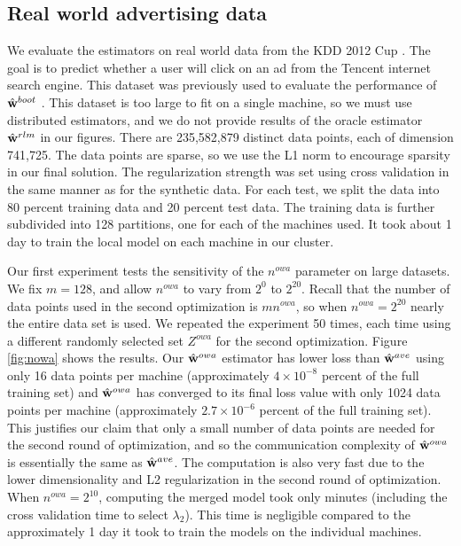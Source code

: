 \documentclass[thesis.tex]{subfiles}
\newcommand{\Zowa}{Z^{\textit{owa}}}
\newcommand{\nowa}{n^{\textit{owa}}}
\begin{document}
\vspace{-0.1in}
\subsection{Real world advertising data}

\vspace{-0.05in}
We evaluate the estimators on real world data from the KDD 2012 Cup \citep{kddcup2012}.
The goal is to predict whether a user will click on an ad from the Tencent internet search engine.
This dataset was previously used to evaluate the performance of $\hat{\mathbf w}^{boot}$ \citep{zhang2012communication}.
This dataset is too large to fit on a single machine,
so we must use distributed estimators,
and we do not provide results of the oracle estimator $\hat{\mathbf w}^{rlm}$ in our figures.
There are 235,582,879 distinct data points,
each of dimension 741,725.
The data points are sparse, so we use the L1 norm to encourage sparsity in our final solution.
The regularization strength was set using cross validation in the same manner as for the synthetic data.
For each test, we split the data into 80 percent training data and 20 percent test data.
The training data is further subdivided into 128 partitions,
one for each of the machines used.
It took about 1 day to train the local model on each machine in our cluster.

Our first experiment tests the sensitivity of the $\nowa$ parameter on large datasets.
We fix $m=128$, and allow $\nowa$ to vary from $2^0$ to $2^{20}$.
Recall that the number of data points used in the second optimization is $m\nowa$,
so when $\nowa=2^{20}$ nearly the entire data set is used.
We repeated the experiment 50 times, each time using a different randomly selected set $\Zowa$ for the second optimization.
Figure \ref{fig:nowa} shows the results.
Our $\hat{\mathbf w}^{owa}$ estimator has lower loss than $\hat{\mathbf w}^{ave}$ using only 16 data points per machine (approximately $4\times10^{-8}$ percent of the full training set)
and $\hat{\mathbf w}^{owa}$ has converged to its final loss value with only 1024 data points per machine (approximately $2.7\times10^{-6}$ percent of the full training set).
This justifies our claim that only a small number of data points are needed for the second round of optimization,
and so the communication complexity of $\hat{\mathbf w}^{owa}$ is essentially the same as $\hat{\mathbf w}^{ave}$.
The computation is also very fast due to the lower dimensionality and L2 regularization in the second round of optimization.
When $\nowa=2^{10}$, computing the merged model took only minutes 
(including the cross validation time to select $\lambda_2$).
This time is negligible compared to the approximately 1 day it took to train the models on the individual machines. 
\end{document}
